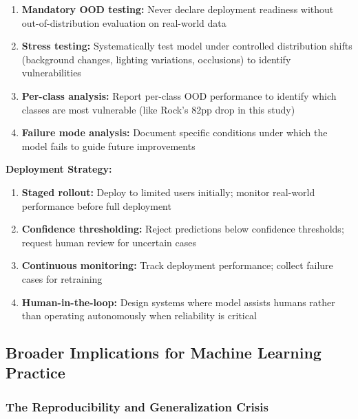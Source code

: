 \documentclass[12pt,a4paper]{article}
\begin{document}
\begin{enumerate}
    \item \textbf{Mandatory OOD testing:} Never declare deployment readiness without out-of-distribution evaluation on real-world data
    
    \item \textbf{Stress testing:} Systematically test model under controlled distribution shifts (background changes, lighting variations, occlusions) to identify vulnerabilities
    
    \item \textbf{Per-class analysis:} Report per-class OOD performance to identify which classes are most vulnerable (like Rock's 82pp drop in this study)
    
    \item \textbf{Failure mode analysis:} Document specific conditions under which the model fails to guide future improvements
\end{enumerate}

\textbf{Deployment Strategy:}

\begin{enumerate}
    \item \textbf{Staged rollout:} Deploy to limited users initially; monitor real-world performance before full deployment
    
    \item \textbf{Confidence thresholding:} Reject predictions below confidence thresholds; request human review for uncertain cases
    
    \item \textbf{Continuous monitoring:} Track deployment performance; collect failure cases for retraining
    
    \item \textbf{Human-in-the-loop:} Design systems where model assists humans rather than operating autonomously when reliability is critical
\end{enumerate}

\subsection{Broader Implications for Machine Learning Practice}

\subsubsection{The Reproducibility and Generalization Crisis}
\end{document}
